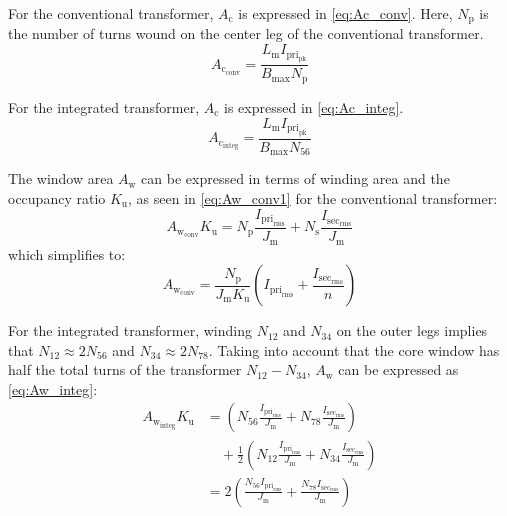 \documentclass[lettersize,journal]{IEEEtran}
\begin{document}
For the conventional transformer, $A_{\mathrm{c}}$ is expressed in \eqref{eq:Ac_conv}. Here, $N_{\mathrm{p}}$ is the number of turns wound on the center leg of the conventional transformer.
\begin{equation}
\label{eq:Ac_conv}
A_{\mathrm{c}_{\mathrm{conv}}} = \frac{L_{\mathrm{m}} I_{\mathrm{pri}_{\mathrm{pk}}}}{B_{\mathrm{max}} N_{\mathrm{p}}}
\end{equation}

For the integrated transformer, $A_{\mathrm{c}}$ is expressed in \eqref{eq:Ac_integ}.
\begin{equation}
\label{eq:Ac_integ}
A_{\mathrm{c}_{\mathrm{integ}}} = \frac{L_{\mathrm{m}} I_{\mathrm{pri}_{\mathrm{pk}}}}{B_{\mathrm{max}} N_{56}}
\end{equation}

The window area $A_{\mathrm{w}}$ can be expressed in terms of winding area and the occupancy ratio $K_{\mathrm{u}}$, as seen in \eqref{eq:Aw_conv1} for the conventional transformer:
\begin{equation}
\label{eq:Aw_conv1}
A_{\mathrm{w}_{\mathrm{conv}}} K_{\mathrm{u}} = N_{\mathrm{p}} \frac{I_{\mathrm{pri}_{\mathrm{rms}}}}{J_{\mathrm{m}}} + N_{\mathrm{s}} \frac{I_{\mathrm{sec}_{\mathrm{rms}}}}{J_{\mathrm{m}}}
\end{equation}
which simplifies to:
\begin{equation}
\label{eq:Aw_conv2}
A_{\mathrm{w}_{\mathrm{conv}}} = \frac{N_{\mathrm{p}}}{J_{\mathrm{m}} K_{\mathrm{u}}} \left(I_{\mathrm{pri}_{\mathrm{rms}}} + \frac{I_{\mathrm{sec}_{\mathrm{rms}}}}{n}\right)
\end{equation}

For the integrated transformer, winding $N_{12}$ and $N_{34}$ on the outer legs implies that $N_{12} \approx 2N_{56}$ and $N_{34} \approx 2N_{78}$. Taking into account that the core window has half the total turns of the transformer $N_{12}-N_{34}$, $A_{\mathrm{w}}$ can be expressed as \eqref{eq:Aw_integ}:
\begin{align}
\label{eq:Aw_integ}
A_{\mathrm{w}_{\mathrm{integ}}} K_{\mathrm{u}} &= \left(N_{56} \frac{I_{\mathrm{pri}_{\mathrm{rms}}}}{J_{\mathrm{m}}} + N_{78} \frac{I_{\mathrm{sec}_{\mathrm{rms}}}}{J_{\mathrm{m}}}\right) \nonumber \\
&\quad + \frac{1}{2}\left(N_{12} \frac{I_{\mathrm{pri}_{\mathrm{rms}}}}{J_{\mathrm{m}}} + N_{34} \frac{I_{\mathrm{sec}_{\mathrm{rms}}}}{J_{\mathrm{m}}}\right) \nonumber \\
&= 2 \left( \frac{N_{56} I_{\mathrm{pri}_{\mathrm{rms}}}}{J_{\mathrm{m}}} + \frac{N_{78} I_{\mathrm{sec}_{\mathrm{rms}}}}{J_{\mathrm{m}}} \right) 
\end{align}
\end{document}
